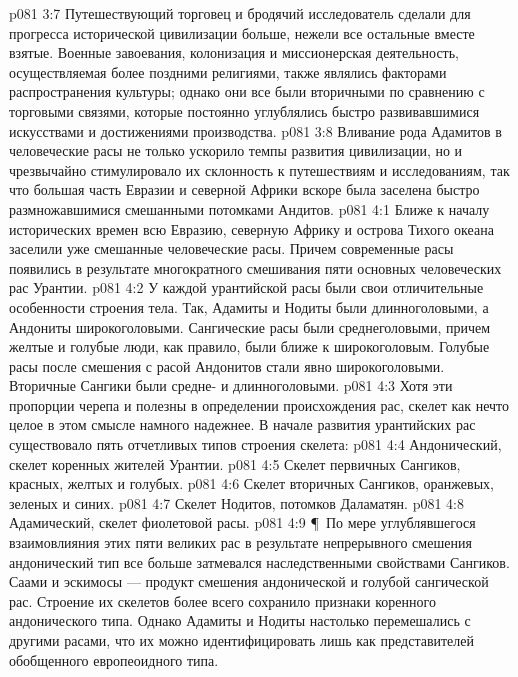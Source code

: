 \vs p081 3:7 Путешествующий торговец и бродячий исследователь сделали для прогресса исторической цивилизации больше, нежели все остальные вместе взятые. Военные завоевания, колонизация и миссионерская деятельность, осуществляемая более поздними религиями, также являлись факторами распространения культуры; однако они все были вторичными по сравнению с торговыми связями, которые постоянно углублялись быстро развивавшимися искусствами и достижениями производства.
\vs p081 3:8 Вливание рода Адамитов в человеческие расы не только ускорило темпы развития цивилизации, но и чрезвычайно стимулировало их склонность к путешествиям и исследованиям, так что большая часть Евразии и северной Африки вскоре была заселена быстро размножавшимися смешанными потомками Андитов.
\vs p081 4:1 Ближе к началу исторических времен всю Евразию, северную Африку и острова Тихого океана заселили уже смешанные человеческие расы. Причем современные расы появились в результате многократного смешивания пяти основных человеческих рас Урантии.
\vs p081 4:2 У каждой урантийской расы были свои отличительные особенности строения тела. Так, Адамиты и Нодиты были длинноголовыми, а Андониты широкоголовыми. Сангические расы были среднеголовыми, причем желтые и голубые люди, как правило, были ближе к широкоголовым. Голубые расы после смешения с расой Андонитов стали явно широкоголовыми. Вторичные Сангики были средне\hyp{} и длинноголовыми.
\vs p081 4:3 Хотя эти пропорции черепа и полезны в определении происхождения рас, скелет как нечто целое в этом смысле намного надежнее. В начале развития урантийских рас существовало пять отчетливых типов строения скелета:
\vs p081 4:4 \bibnobreakspace Андонический, скелет коренных жителей Урантии.
\vs p081 4:5 \bibnobreakspace Скелет первичных Сангиков, красных, желтых и голубых.
\vs p081 4:6 \bibnobreakspace Скелет вторичных Сангиков, оранжевых, зеленых и синих.
\vs p081 4:7 \bibnobreakspace Скелет Нодитов, потомков Даламатян.
\vs p081 4:8 \bibnobreakspace Адамический, скелет фиолетовой расы.
\vs p081 4:9 \P\ По мере углублявшегося взаимовлияния этих пяти великих рас в результате непрерывного смешения андонический тип все больше затмевался наследственными свойствами Сангиков. Саами и эскимосы --- продукт смешения андонической и голубой сангической рас. Строение их скелетов более всего сохранило признаки коренного андонического типа. Однако Адамиты и Нодиты настолько перемешались с другими расами, что их можно идентифицировать лишь как представителей обобщенного европеоидного типа.
